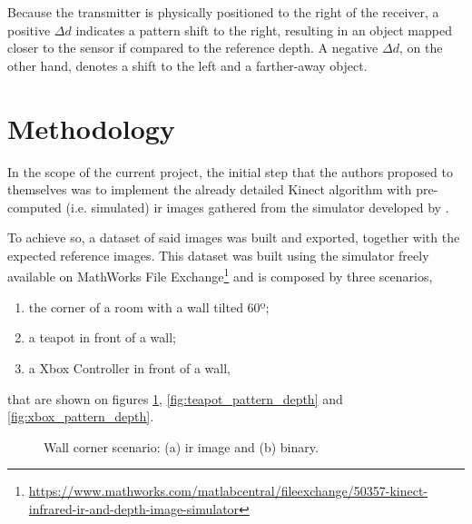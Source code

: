 \documentclass[journal]{IEEEtran}
\begin{document}
Because the transmitter is physically positioned to the right of the receiver, a positive $\Delta d$ indicates a pattern shift to the right, resulting in an object mapped closer to the sensor if compared to the reference depth. A negative $\Delta d$, on the other hand, denotes a shift to the left and a farther-away object.

\section{Methodology}

In the scope of the current project, the initial step that the authors proposed to themselves was to implement the already detailed Kinect algorithm with pre-computed (i.e. simulated) \gls{ir} images gathered from the simulator developed by \cite{landau2016kinect}. 

To achieve so, a dataset of said images was built and exported, together with the expected reference images. This dataset was built using the simulator freely available on MathWorks File Exchange\footnote{\url{https://www.mathworks.com/matlabcentral/fileexchange/50357-kinect-infrared-ir-and-depth-image-simulator}} and is composed by three scenarios,
%
\begin{enumerate}
    \item the corner of a room with a wall tilted 60º;
    \item a teapot in front of a wall;
    \item a Xbox Controller in front of a wall,
\end{enumerate}
%
that are shown on figures \ref{fig:wall_pattern_depth}, \ref{fig:teapot_pattern_depth}
and \ref{fig:xbox_pattern_depth}.

\begin{figure}[!t]
    \centering
        \hfil
    \caption{Wall corner scenario: (a) \gls{ir} image and (b) binary.}
    \label{fig:wall_pattern_depth}
\end{figure}
\end{document}
